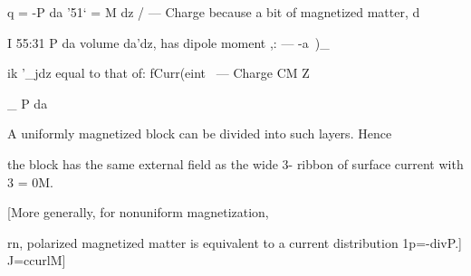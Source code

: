 q = -P da '51‘ = M dz
/ ---  Charge because a bit of magnetized matter, d

I 55:31 P da volume da'dz, has dipole moment ,: --- -a~)_

ik '_jdz equal to that of: fCurr(eint
\ --- Charge CM Z

_ P da 

A uniformly magnetized block can
be divided into such layers. Hence

the block has the
same external  
field as the wide  3-
ribbon of surface 
current with 3 = 0M.

[More generally, for nonuniform magnetization,

rn, polarized magnetized matter is equivalent to a current distribution
1p=-divP.] J=ccurlM]

      

